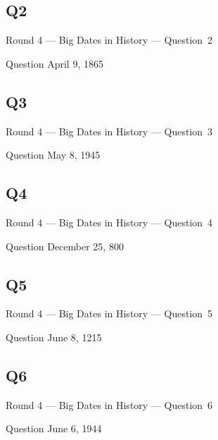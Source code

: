 \documentclass[11pt]{beamer}
\begin{document}
\subsection*{Q2}
\begin{frame}[t]{Round 4 --- Big Dates in History --- \mbox{Question 2}}
\begin{block}{Question}
April 9, 1865
\end{block}
\end{frame}
\subsection*{Q3}
\begin{frame}[t]{Round 4 --- Big Dates in History --- \mbox{Question 3}}
\begin{block}{Question}
May 8, 1945
\end{block}
\end{frame}
\subsection*{Q4}
\begin{frame}[t]{Round 4 --- Big Dates in History --- \mbox{Question 4}}
\begin{block}{Question}
December 25, 800
\end{block}
\end{frame}
\subsection*{Q5}
\begin{frame}[t]{Round 4 --- Big Dates in History --- \mbox{Question 5}}
\begin{block}{Question}
June 8, 1215
\end{block}
\end{frame}
\subsection*{Q6}
\begin{frame}[t]{Round 4 --- Big Dates in History --- \mbox{Question 6}}
\begin{block}{Question}
June 6, 1944
\end{block}
\end{frame}
\end{document}
